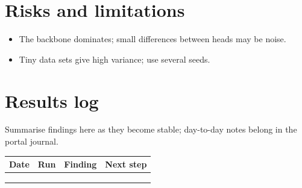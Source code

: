 \documentclass[11pt,a4paper]{article}
\begin{document}
\section{Risks and limitations}
\begin{itemize}
  \item The backbone dominates; small differences between heads may be noise.
  \item Tiny data sets give high variance; use several seeds.
\end{itemize}

\section{Results log}
\label{sec:log}
Summarise findings here as they become stable; day-to-day notes belong in the portal journal.

\begin{table}[h]
\centering\small
\begin{tabularx}{\linewidth}{@{}l l >{\raggedright}X >{\raggedright\arraybackslash}X@{}}
\toprule
Date & Run & Finding & Next step \\
\midrule
 & & & \\
 & & & \\
 & & & \\
\bottomrule
\end{tabularx}
\end{table}



\end{document}
